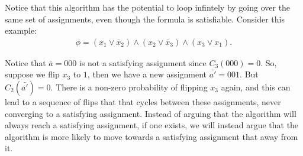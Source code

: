 Notice that this algorithm has the potential to loop infintely by going over the
same set of assignments, even though the formula is satisfiable. Consider this
example:
\begin{align*}
  \phi = (x_1 \vee \bar{x}_2) \wedge (x_2 \vee \bar{x}_3) \wedge (x_3 \vee x_1).
\end{align*}

Notice that $\bar{a} = 000$ is not a satisfying assignment since $C_3(000) =
0$. So, suppose we flip $x_3$ to $1$, then we have a new assignment
$\bar{a'} = 001$. But $C_2(\bar{a'}) = 0$. There is a non-zero probability of
flipping $x_3$ again, and this can lead to a sequence of flips that that cycles
between these assignments, never converging to a satisfying assignment. Instead
of arguing that the algorithm will always reach a satisfying assignment, if one
exists, we will instead argue that the algorithm is more likely to move towards
a satisfying assignment that away from it.


